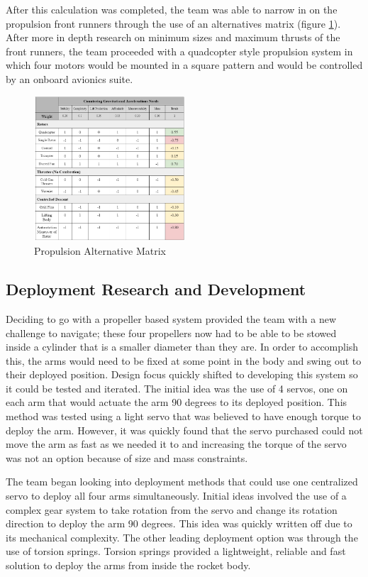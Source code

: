 After this calculation was completed, the team was able to narrow in on the propulsion front runners through the use of an alternatives matrix (figure \ref{fig:PAM}). After more in depth research on minimum sizes and maximum thrusts of the front runners, the team proceeded with a quadcopter style propulsion system in which four motors would be mounted in a square pattern and would be controlled by an onboard avionics suite. 

\begin{figure}[H]
    \centering
    \includegraphics[width=0.5\textwidth]{src/figs/AltProp.png}
    \caption{Propulsion Alternative Matrix}
    \label{fig:PAM}
\end{figure}

\subsection{Deployment Research and Development}
Deciding to go with a propeller based system provided the team with a new challenge to navigate; these four propellers now had to be able to be stowed inside a cylinder that is a smaller diameter than they are. In order to accomplish this, the arms would need to be fixed at some point in the body and swing out to their deployed position. Design focus quickly shifted to developing this system so it could be tested and iterated. The initial idea was the use of 4 servos, one on each arm that would actuate the arm 90 degrees to its deployed position. This method was tested using a light servo that was believed to have enough torque to deploy the arm. However, it was quickly found that the servo purchased could not move the arm as fast as we needed it to and increasing the torque of the servo was not an option because of size and mass constraints. 

The team began looking into deployment methods that could use one centralized servo to deploy all four arms simultaneously. Initial ideas involved the use of a complex gear system to take rotation from the servo and change its rotation direction to deploy the arm 90 degrees. This idea was quickly written off due to its mechanical complexity. The other leading deployment option was through the use of torsion springs. Torsion springs provided a lightweight, reliable and fast solution to deploy the arms from inside the rocket body. 


